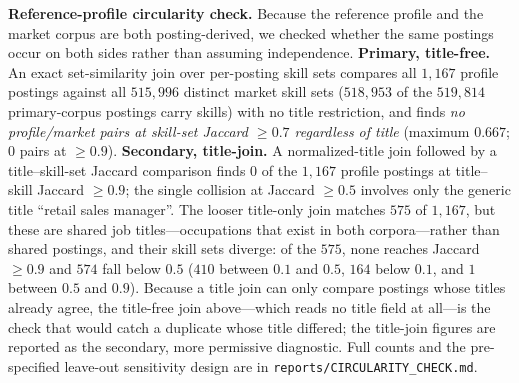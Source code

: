 \documentclass[journal]{IEEEtran}
\begin{document}
\textbf{Reference-profile circularity check.} Because the reference profile and the market corpus are both posting-derived, we checked whether the same postings occur on both sides rather than assuming independence. \textbf{Primary, title-free.} An exact set-similarity join over per-posting skill sets compares all $1{,}167$ profile postings against all $515{,}996$ distinct market skill sets ($518{,}953$ of the $519{,}814$ primary-corpus postings carry skills) with no title restriction, and finds \emph{no profile/market pairs at skill-set Jaccard $\geq 0.7$ regardless of title} (maximum $0.667$; $0$ pairs at $\geq 0.9$). \textbf{Secondary, title-join.} A normalized-title join followed by a title--skill-set Jaccard comparison finds $0$ of the $1{,}167$ profile postings at title--skill Jaccard $\geq 0.9$; the single collision at Jaccard $\geq 0.5$ involves only the generic title ``retail sales manager''. The looser title-only join matches $575$ of $1{,}167$, but these are shared job titles---occupations that exist in both corpora---rather than shared postings, and their skill sets diverge: of the $575$, none reaches Jaccard $\geq 0.9$ and $574$ fall below $0.5$ ($410$ between $0.1$ and $0.5$, $164$ below $0.1$, and $1$ between $0.5$ and $0.9$). Because a title join can only compare postings whose titles already agree, the title-free join above---which reads no title field at all---is the check that would catch a duplicate whose title differed; the title-join figures are reported as the secondary, more permissive diagnostic. Full counts and the pre-specified leave-out sensitivity design are in \texttt{reports/CIRCULARITY\_CHECK.md}.
\end{document}
